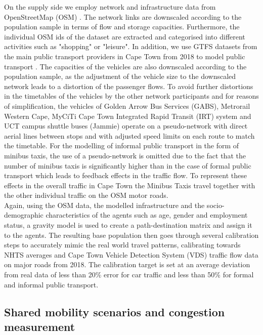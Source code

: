 \documentclass[a4paper]{article}
\begin{document}
On the supply side we employ network and infrastructure data from OpenStreetMap (OSM) \citep{osm}. The network links are downscaled according to the population sample in terms of flow and storage capacities. Furthermore, the individual OSM ids of the dataset are extracted and categorised into different activities such as "shopping" or "leisure". In addition, we use GTFS datasets from the main public transport providers in Cape Town from 2018 to model public transport \citep{transifeeds}. The capacities of the vehicles are also downscaled according to the population sample, as the adjustment of the vehicle size to the downscaled network leads to a distortion of the passenger flows. To avoid further distortions in the timetables of the vehicles by the other network participants and for reasons of simplification, the vehicles of Golden Arrow Bus Services (GABS), Metrorail Western Cape, MyCiTi Cape Town Integrated Rapid Transit (IRT) system and UCT campus shuttle buses (Jammie) operate on a pseudo-network with direct aerial lines between stops and with adjusted speed limits on each route to match the timetable. For the modelling of informal public transport in the form of minibus taxis, the use of a pseudo-network is omitted due to the fact that the number of minibus taxis is significantly higher than in the case of formal public transport which leads to feedback effects in the traffic flow. To represent these effects in the overall traffic in Cape Town the Minibus Taxis travel together with the other individual traffic on the OSM motor roads.\\

Again, using the OSM data, the modelled infrastructure and the socio-demographic characteristics of the agents such as age, gender and employment status, a gravity model is used to create a path-destination matrix and assign it to the agents. The resulting base population then goes through several calibration steps to accurately mimic the real world travel patterns, calibrating towards NHTS averages and Cape Town Vehicle Detection System (VDS) traffic flow data on major roads from 2018. The calibration target is set at an average deviation from real data of less than 20\% error for car traffic and less than 50\% for formal and informal public transport.\\



\subsection*{Shared mobility scenarios and congestion measurement} 
 
\end{document}
